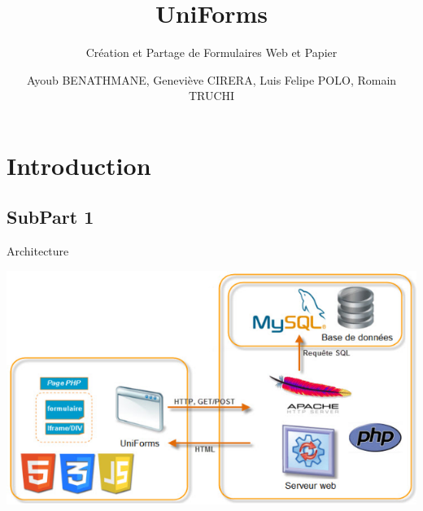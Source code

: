 \documentclass[11pt]{beamer}
\title{UniForms}
\author[Ayoub BENATHMANE, Geneviève CIRERA, Luis Felipe POLO, Romain TRUCHI]{Ayoub BENATHMANE, Geneviève CIRERA, Luis Felipe POLO, Romain TRUCHI\\\vspace{1cm}{\small Encadrant : Michel GAUTERO}}
\institute{Polytech'Nice-Sophia}
\subtitle{Création et Partage de Formulaires 
Web et Papier}
\date{\oldstylenums{\today}}
\begin{document}
\begin{frame}
\titlepage
\end{frame}


\section{Introduction}
\subsection*{SubPart 1}

\begin{frame}{Architecture}
\begin{center}
\includegraphics[width=.8\paperwidth]{images/architecture.png}
\end{center}
\end{frame}
\end{document}
